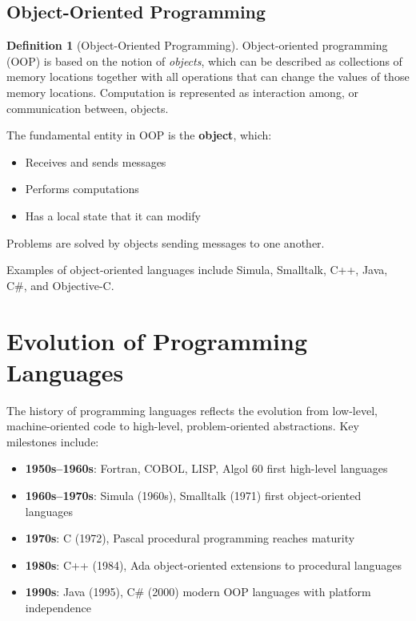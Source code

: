 \documentclass[11pt, a4paper, notitlepage]{report}
\theoremstyle{definition}
\newtheorem{definition}[theorem]{Definition}
\theoremstyle{remark}
\theoremstyle{definition}
\begin{document}
\subsection{Object-Oriented Programming}

\begin{definition}[Object-Oriented Programming]
\label{def:ch1-oop}
Object-oriented programming (OOP) is based on the notion of \emph{objects}, which can be described as collections of memory locations together with all operations that can change the values of those memory locations. Computation is represented as interaction among, or communication between, objects.
\end{definition}

\begin{keyresult}[title={Fundamental Entity in OOP}]
The fundamental entity in OOP is the \textbf{object}, which:
\begin{itemize}
  \item Receives and sends messages
  \item Performs computations
  \item Has a local state that it can modify
\end{itemize}
Problems are solved by objects sending messages to one another.
\end{keyresult}

Examples of object-oriented languages include Simula, Smalltalk, C++, Java, C\#, and Objective-C.

\section{Evolution of Programming Languages}
\label{sec:ch1-evolution}

The history of programming languages reflects the evolution from low-level, machine-oriented code to high-level, problem-oriented abstractions. Key milestones include:

\begin{itemize}
  \item \textbf{1950s--1960s}: Fortran, COBOL, LISP, Algol 60  first high-level languages
  \item \textbf{1960s--1970s}: Simula (1960s), Smalltalk (1971)  first object-oriented languages
  \item \textbf{1970s}: C (1972), Pascal  procedural programming reaches maturity
  \item \textbf{1980s}: C++ (1984), Ada  object-oriented extensions to procedural languages
  \item \textbf{1990s}: Java (1995), C\# (2000)  modern OOP languages with platform independence
\end{itemize}
\end{document}
